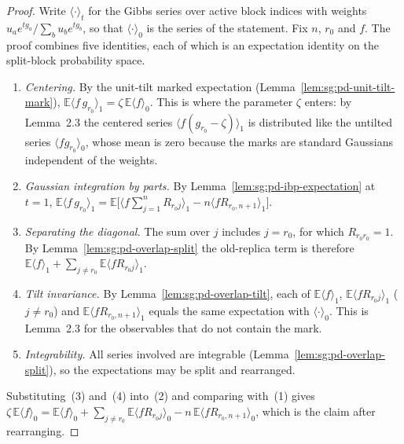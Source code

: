 \begin{proof}
  \leanok
Write $\langle\cdot\rangle_t$ for the Gibbs series over active block indices with weights $u_ae^{tg_a}/\sum_bu_be^{tg_b}$, so that $\langle\cdot\rangle_0$ is the series of the statement. Fix $n$, $r_0$ and $f$. The proof combines five identities, each of which is an expectation identity on the split-block probability space.
\begin{enumerate}
\item \emph{Centering.} By the unit-tilt marked expectation (Lemma~\ref{lem:sg:pd-unit-tilt-mark}), $\mathbb E\langle f\,g_{r_0}\rangle_1=\zeta\,\mathbb E\langle f\rangle_0$. This is where the parameter $\zeta$ enters: by Lemma~2.3 the centered series $\langle f(g_{r_0}-\zeta)\rangle_1$ is distributed like the untilted series $\langle fg_{r_0}\rangle_0$, whose mean is zero because the marks are standard Gaussians independent of the weights.
\item \emph{Gaussian integration by parts.} By Lemma~\ref{lem:sg:pd-ibp-expectation} at $t=1$, $\mathbb E\langle f\,g_{r_0}\rangle_1=\mathbb E\bigl[\langle f\sum_{j=1}^nR_{r_0j}\rangle_1-n\langle fR_{r_0,n+1}\rangle_1\bigr]$.
\item \emph{Separating the diagonal.} The sum over $j$ includes $j=r_0$, for which $R_{r_0r_0}=1$. By Lemma~\ref{lem:sg:pd-overlap-split} the old-replica term is therefore $\mathbb E\langle f\rangle_1+\sum_{j\ne r_0}\mathbb E\langle fR_{r_0j}\rangle_1$.
\item \emph{Tilt invariance.} By Lemma~\ref{lem:sg:pd-overlap-tilt}, each of $\mathbb E\langle f\rangle_1$, $\mathbb E\langle fR_{r_0j}\rangle_1$ ($j\ne r_0$) and $\mathbb E\langle fR_{r_0,n+1}\rangle_1$ equals the same expectation with $\langle\cdot\rangle_0$. This is Lemma~2.3 for the observables that do not contain the mark.
\item \emph{Integrability.} All series involved are integrable (Lemma~\ref{lem:sg:pd-overlap-split}), so the expectations may be split and rearranged.
\end{enumerate}
Substituting~(3) and~(4) into~(2) and comparing with~(1) gives $\zeta\,\mathbb E\langle f\rangle_0=\mathbb E\langle f\rangle_0+\sum_{j\ne r_0}\mathbb E\langle fR_{r_0j}\rangle_0-n\,\mathbb E\langle fR_{r_0,n+1}\rangle_0$, which is the claim after rearranging.
\end{proof}

